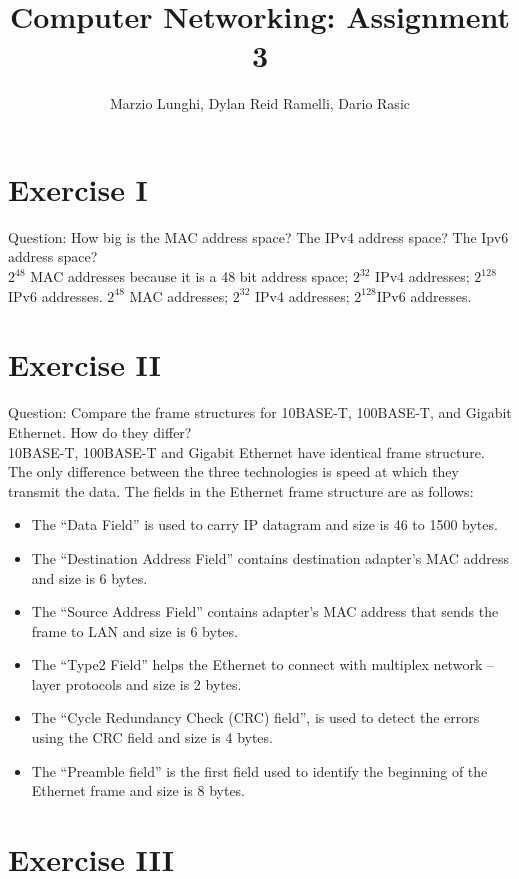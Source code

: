 \documentclass[11pt]{article}
\title{Computer Networking: Assignment 3}
\author{Marzio Lunghi, Dylan Reid Ramelli, Dario Rasic}
\begin{document}
	\maketitle
	\newpage
	\section*{Exercise I}
	Question: How big is the MAC address space? The IPv4 address space? The Ipv6 address space?\\
	$2^{48}$ MAC addresses because it is a 48 bit address space; $2^{32}$ IPv4 addresses; $2^{128}$IPv6 addresses.
	\linebreak
	$2^{48}$ MAC addresses; $2^{32}$ IPv4 addresses; $2^{128}$IPv6 addresses.
	\section*{Exercise II}
	Question: Compare the frame structures for 10BASE-T, 100BASE-T,
	and Gigabit Ethernet. How do they differ?\\
	\linebreak
	10BASE-T, 100BASE-T and Gigabit Ethernet have identical frame structure.
	The only difference between the three technologies is speed at which they transmit the data.
	The fields in the Ethernet frame structure are as follows:
	\begin{itemize}
		\item The “Data Field” is used to carry IP datagram and size is 46 to 1500 bytes.
		\item 	The “Destination Address Field” contains destination adapter’s MAC address and size is 6 bytes.
		\item 	The “Source Address Field” contains adapter’s MAC address that sends the frame to LAN and size is 6 bytes.
		\item 	The “Type2 Field” helps the Ethernet to connect with multiplex network – layer protocols and size is 2 bytes.
		\item The “Cycle Redundancy Check (CRC) field”, is used to detect the errors using the CRC field and size is 4 bytes.
		\item 	The “Preamble field” is the first field used to identify the beginning of the Ethernet frame and size is 8 bytes.
	\end{itemize}

	\section*{Exercise III}
\end{document}
